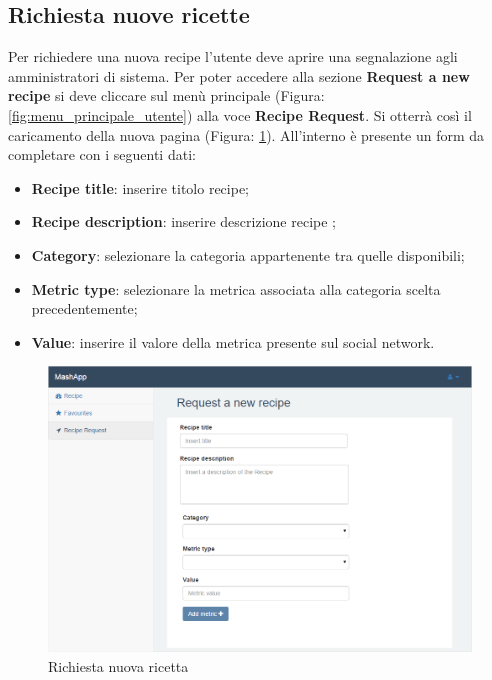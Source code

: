 	\pagebreak
	\subsection{Richiesta nuove ricette} %
	\label{sec:Richiesta nuove ricette}
		Per richiedere una nuova recipe l'utente deve aprire una segnalazione agli amministratori di sistema.\newline
		Per poter accedere alla sezione \textbf{Request a new recipe} si deve cliccare sul menù principale (Figura: \ref{fig:menu_principale_utente}) alla voce \textbf{Recipe Request}.
		Si otterrà così il caricamento della nuova pagina (Figura: \ref{fig:richiesta_nuova_ricetta}). All'interno è presente un form da completare con i seguenti dati:
		\begin{itemize}
			\item \textbf{Recipe title}: inserire titolo recipe;
			\item \textbf{Recipe description}: inserire descrizione recipe ;
			\item \textbf{Category}: selezionare la categoria appartenente tra quelle disponibili;
			\item \textbf{Metric type}: selezionare la metrica associata alla categoria scelta precedentemente;
			\item \textbf{Value}: inserire il valore della metrica presente sul social network.
		\end{itemize}
		\begin{figure}[H]
			\centering
			\centerline{\includegraphics[width=14cm]{images/richiesta_nuova_ricetta.png}}
			\caption{Richiesta nuova ricetta}
			\label{fig:richiesta_nuova_ricetta}
		\end{figure}


